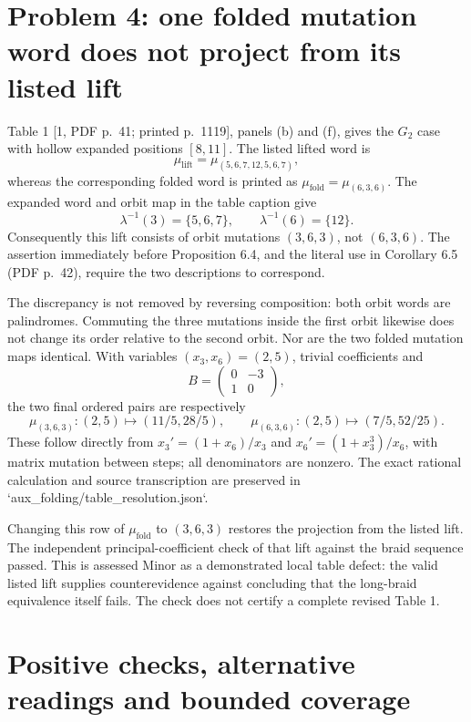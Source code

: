 \documentclass[10pt]{article}
\begin{document}
\section*{Problem 4: one folded mutation word does not project from its listed lift}
Table 1 [1, PDF p. 41; printed p. 1119], panels (b) and (f), gives the \(G_2\) case with hollow expanded positions \([8,11]\). The listed lifted word is \[\mu_{\mathrm{lift}}=\mu_{(5,6,7,12,5,6,7)},\] whereas the corresponding folded word is printed as \(\mu_{\mathrm{fold}}=\mu_{(6,3,6)}\). The expanded word and orbit map in the table caption give \[\lambda^{-1}(3)=\{5,6,7\},\qquad \lambda^{-1}(6)=\{12\}.\] Consequently this lift consists of orbit mutations \((3,6,3)\), not \((6,3,6)\). The assertion immediately before Proposition 6.4, and the literal use in Corollary 6.5 (PDF p. 42), require the two descriptions to correspond.\par
The discrepancy is not removed by reversing composition: both orbit words are palindromes. Commuting the three mutations inside the first orbit likewise does not change its order relative to the second orbit. Nor are the two folded mutation maps identical. With variables \((x_3,x_6)=(2,5)\), trivial coefficients and \[B=\begin{pmatrix}0&-3\\1&0\end{pmatrix},\] the two final ordered pairs are respectively \[\mu_{(3,6,3)}:(2,5)\mapsto(11/5,28/5),\qquad
 \mu_{(6,3,6)}:(2,5)\mapsto(7/5,52/25).\] These follow directly from \(x_3'=(1+x_6)/x_3\) and \(x_6'=(1+x_3^3)/x_6\), with matrix mutation between steps; all denominators are nonzero. The exact rational calculation and source transcription are preserved in `aux\_folding/table\_resolution.json`.\par
Changing this row of \(\mu_{\mathrm{fold}}\) to \((3,6,3)\) restores the projection from the listed lift. The independent principal-coefficient check of that lift against the braid sequence passed. This is assessed Minor as a demonstrated local table defect: the valid listed lift supplies counterevidence against concluding that the long-braid equivalence itself fails. The check does not certify a complete revised Table 1.\par
\section*{Positive checks, alternative readings and bounded coverage}
\end{document}
